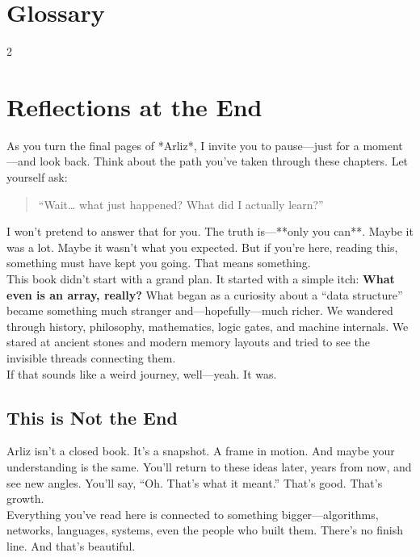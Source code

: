 \backmatter

\pagestyle{backmatter}
\appendix
	\chapter*{Glossary}
	\begin{multicols}{2}
			
	\end{multicols}
	\printbibliography[title={Bibliography \& Further Reading}]
	\chapter*{Reflections at the End}
	
	As you turn the final pages of *Arliz*, I invite you to pause—just for a moment—and look back. Think about the path you’ve taken through these chapters. Let yourself ask:  
	\begin{quote}
		“Wait… what just happened? What did I actually learn?”
	\end{quote}
	I won’t pretend to answer that for you. The truth is—**only you can**. Maybe it was a lot. Maybe it wasn’t what you expected. But if you’re here, reading this, something must have kept you going. That means something. \\	
	This book didn’t start with a grand plan. It started with a simple itch: \textbf{What even is an array, really?} What began as a curiosity about a “data structure” became something much stranger and—hopefully—much richer. We wandered through history, philosophy, mathematics, logic gates, and machine internals. We stared at ancient stones and modern memory layouts and tried to see the invisible threads connecting them.\\
	If that sounds like a weird journey, well—yeah. It was.
		
	\section*{This is Not the End}
	Arliz isn’t a closed book. It’s a snapshot. A frame in motion. And maybe your understanding is the same. You'll return to these ideas later, years from now, and see new angles. You’ll say, “Oh. That’s what it meant.” That’s good. That’s growth.\\	
	Everything you’ve read here is connected to something bigger—algorithms, networks, languages, systems, even the people who built them. There’s no finish line. And that’s beautiful.  
